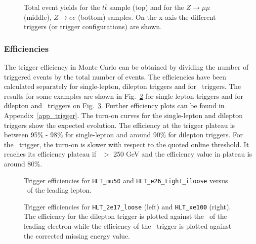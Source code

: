 \begin{figure}[htb!]
\centering
{}
\caption{Total event yields for the $t \bar{t}$ sample (top) and for the $Z \rightarrow \mu \mu$ (middle), $Z \rightarrow ee$ (bottom) samples. On the x-axis the different triggers (or trigger configurations) are shown.}
\label{fig:events}
\end{figure}

\subsubsection{Efficiencies}

The trigger efficiency in Monte Carlo can be obtained by dividing the number of triggered events by the total number of events. The efficiencies have been calculated separately for single-lepton, dilepton triggers and for \met\ triggers. The results for some examples are shown in Fig.~\ref{fig:eff_singlelepton} for single lepton triggers and for dilepton and \met\ triggers on Fig.~\ref{fig:eff_dilepton_met}. Further efficiency plots can be found in Appendix~\ref{app_trigger}. The turn-on curves for the single-lepton and dilepton triggers show the expected evolution. The efficiency at the trigger plateau is between 95\% - 98\% for single-lepton and around 90\% for dilepton triggers. For the \met\ trigger, the turn-on is slower with respect to the quoted online threshold. It reaches its efficiency plateau if \met\ $>$ 250 GeV and the efficiency value in plateau is around 80\%.  

\begin{figure}[htb!]
\centering
{}
\caption{Trigger efficiencies for \texttt{HLT\_mu50} and \texttt{HLT\_e26\_tight\_iloose} versus \pt\ of the leading lepton. 
}
\label{fig:eff_singlelepton}
\end{figure}

\begin{figure}[htb!]
\centering
{}
\caption{Trigger efficiencies for \texttt{HLT\_2e17\_loose} (left) and \texttt{HLT\_xe100} (right). The efficiency for the dilepton trigger is plotted against the \pt\ of the leading electron while the efficiency of the \met\ trigger is plotted against the corrected missing energy value. %
}
\label{fig:eff_dilepton_met}
\end{figure}
